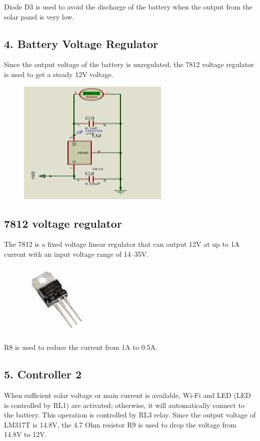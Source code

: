\documentclass[twocolumn]{article}
\begin{document}
\noindent Diode D3 is used to avoid the discharge of the battery when the output from the solar panel is very low.

\subsection*{4. Battery Voltage Regulator}
Since the output voltage of the battery is unregulated, the 7812 voltage regulator is used to get a steady 12V voltage. 

\begin{figure}[h]
    \centering
    \includegraphics{10.png}
    \label{fig:enter-label}
\end{figure}

\subsection*{7812 voltage regulator}
The 7812 is a fixed voltage linear regulator that can output 12V at up to 1A current with an input voltage range of 14–35V. 

\begin{figure}[h]
    \centering
    \includegraphics{11.png}
    \label{fig:enter-label}
\end{figure}

\noindent R8 is used to reduce the current from 1A to 0.5A.

\subsection*{5. Controller 2}
When sufficient solar voltage or main current is available, Wi-Fi and LED (LED is controlled by RL1) are activated; otherwise, it will automatically connect to the battery. This operation is controlled by RL3 relay. Since the output voltage of LM317T is 14.8V, the 4.7 Ohm resistor R9 is used to drop the voltage from 14.8V to 12V.
\end{document}

